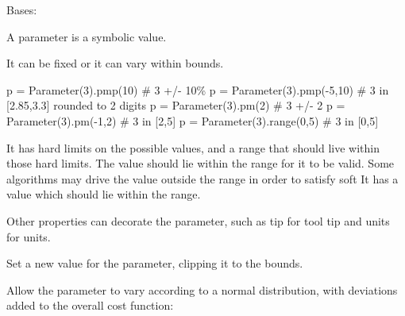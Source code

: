 \documentclass[letterpaper,10pt,english]{sphinxmanual}
\begin{document}
\begin{fulllineitems}
\label{api/mystic.parameter:refl1d.mystic.parameter.Parameter}
Bases: {\hyperref[api/mystic.parameter:refl1d.mystic.parameter.BaseParameter]{}}

A parameter is a symbolic value.

It can be fixed or it can vary within bounds.

p = Parameter(3).pmp(10)    \# 3 +/- 10\%
p = Parameter(3).pmp(-5,10) \# 3 in {[}2.85,3.3{]} rounded to 2 digits
p = Parameter(3).pm(2)      \# 3 +/- 2
p = Parameter(3).pm(-1,2)   \# 3 in {[}2,5{]}
p = Parameter(3).range(0,5) \# 3 in {[}0,5{]}

It has hard limits on the possible values, and a range that should live
within those hard limits.  The value should lie within the range for
it to be valid.  Some algorithms may drive the value outside the range
in order to satisfy soft It has a value which should lie within the range.

Other properties can decorate the parameter, such as tip for tool tip
and units for units.

\begin{fulllineitems}
\label{api/mystic.parameter:refl1d.mystic.parameter.Parameter.clip_set}
Set a new value for the parameter, clipping it to the bounds.

\end{fulllineitems}


\begin{fulllineitems}
\label{api/mystic.parameter:refl1d.mystic.parameter.Parameter.default}
\end{fulllineitems}


\begin{fulllineitems}
\label{api/mystic.parameter:refl1d.mystic.parameter.Parameter.dev}
Allow the parameter to vary according to a normal distribution, with
deviations added to the overall cost function:
\begin{quote}


\end{quote}
\end{fulllineitems}
\end{fulllineitems}
\end{document}
